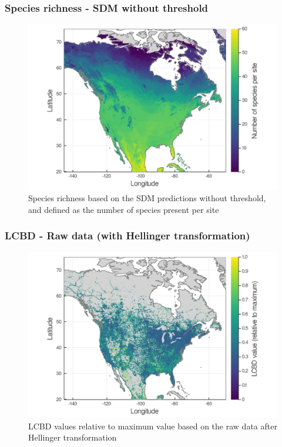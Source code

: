 \documentclass[10pt]{beamer}
\begin{document}
\begin{frame}
  \frametitle{Species richness - SDM without threshold}
  \begin{figure}
    \centering
    \hspace*{-0cm}\includegraphics[scale=0.17]{fig/03_sdm_richness.png}
    \caption{Species richness based on the SDM predictions without threshold, and defined as the number of species present per site}
  \end{figure}
\end{frame}

\begin{frame}
  \frametitle{LCBD - Raw data (with Hellinger transformation)}
  \begin{figure}
    \centering
    \hspace*{-0cm}\includegraphics[scale=0.17]{fig/05_raw_lcbd-transf.png}
    \caption{LCBD values relative to maximum value based on the raw data after Hellinger transformation}
  \end{figure}
\end{frame}
\end{document}
